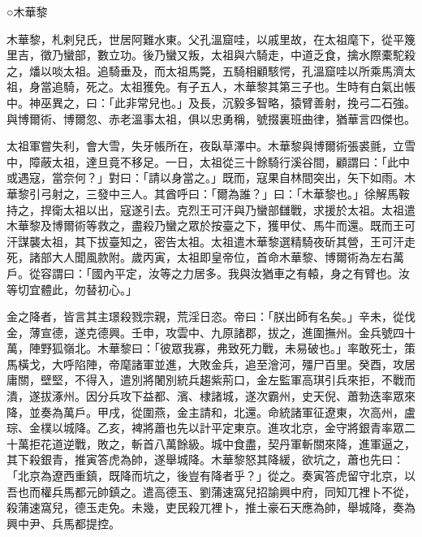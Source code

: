 
\begin{pinyinscope}

 ○木華黎



 木華黎，札剌兒氏，世居阿難水東。父孔溫窟哇，以戚里故，在太祖麾下，從平篾里吉，徵乃蠻部，數立功。後乃蠻又叛，太祖與六騎走，中道乏食，擒水際橐駝殺之，燔以啖太祖。追騎垂及，而太祖馬斃，五騎相顧駭愕，孔溫窟哇以所乘馬濟太祖，身當追騎，死之。太祖獲免。有子五人，木華黎其第三子也。生時有白氣出帳中。神巫異之，曰：「此非常兒也。」及長，沉毅多智略，猿臂善射，挽弓二石強。與博爾術、博爾忽、赤老溫事太祖，俱以忠勇稱，號掇裏班曲律，猶華言四傑也。



 太祖軍嘗失利，會大雪，失牙帳所在，夜臥草澤中。木華黎與博爾術張裘氈，立雪中，障蔽太祖，達旦竟不移足。一日，太祖從三十餘騎行溪谷間，顧謂曰：「此中或遇寇，當奈何？」對曰：「請以身當之。」既而，寇果自林間突出，矢下如雨。木華黎引弓射之，三發中三人。其酋呼曰：「爾為誰？」曰：「木華黎也。」徐解馬鞍持之，捍衛太祖以出，寇遂引去。克烈王可汗與乃蠻部讎戰，求援於太祖。太祖遣木華黎及博爾術等救之，盡殺乃蠻之眾於按臺之下，獲甲仗、馬牛而還。既而王可汗謀襲太祖，其下拔臺知之，密告太祖。太祖遣木華黎選精騎夜斫其營，王可汗走死，諸部大人聞風款附。歲丙寅，太祖即皇帝位，首命木華黎、博爾術為左右萬戶。從容謂曰：「國內平定，汝等之力居多。我與汝猶車之有轅，身之有臂也。汝等切宜體此，勿替初心。」



 金之降者，皆言其主璟殺戮宗親，荒淫日恣。帝曰：「朕出師有名矣。」辛未，從伐金，薄宣德，遂克德興。壬申，攻雲中、九原諸郡，拔之，進圍撫州。金兵號四十萬，陣野狐嶺北。木華黎曰：「彼眾我寡，弗致死力戰，未易破也。」率敢死士，策馬橫戈，大呼陷陣，帝麾諸軍並進，大敗金兵，追至澮河，殭尸百里。癸酉，攻居庸關，壁堅，不得入，遣別將闍別統兵趨紫荊口，金左監軍高琪引兵來拒，不戰而潰，遂拔涿州。因分兵攻下益都、濱、棣諸城，遂次霸州，史天倪、蕭勃迭率眾來降，並奏為萬戶。甲戌，從圍燕，金主請和，北還。命統諸軍征遼東，次高州，盧琮、金樸以城降。乙亥，裨將蕭也先以計平定東京。進攻北京，金守將銀青率眾二十萬拒花道逆戰，敗之，斬首八萬餘級。城中食盡，契丹軍斬關來降，進軍逼之，其下殺銀青，推寅答虎為帥，遂舉城降。木華黎怒其降緩，欲坑之，蕭也先曰：「北京為遼西重鎮，既降而坑之，後豈有降者乎？」從之。奏寅答虎留守北京，以吾也而權兵馬都元帥鎮之。遣高德玉、劉蒲速窩兒招諭興中府，同知兀裡卜不從，殺蒲速窩兒，德玉走免。未幾，吏民殺兀裡卜，推土豪石天應為帥，舉城降，奏為興中尹、兵馬都提控。




\end{pinyinscope}
